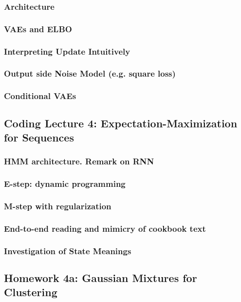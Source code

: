 \documentclass[12pt]{article}
\begin{document}
      \subsubsection*{Architecture} %
      \subsubsection*{VAEs and ELBO}
      \subsubsection*{Interpreting Update Intuitively}
      \subsubsection*{Output side Noise Model (e.g. square loss)}
      \subsubsection*{Conditional VAEs}
    \newpage

    \subsection*{Coding Lecture 4: Expectation-Maximization for Sequences}
      \subsubsection*{HMM architecture.  Remark on RNN}
      \subsubsection*{E-step: dynamic programming}
      \subsubsection*{M-step with regularization}
      \subsubsection*{End-to-end reading and mimicry of cookbook text}
      \subsubsection*{Investigation of State Meanings}
    \newpage

    \subsection*{Homework 4a: Gaussian Mixtures for Clustering} %
\end{document}
